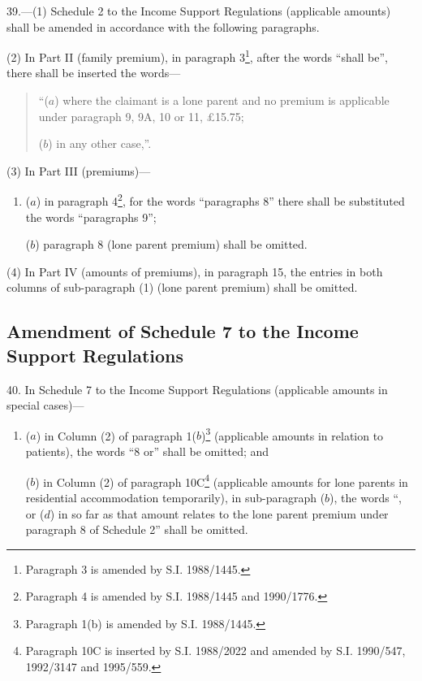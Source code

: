 \documentclass[12pt,a4paper]{article}
\begin{document}
\begin{sloppypar}
39.—(1) Schedule 2 to the Income Support Regulations (applicable amounts) shall be amended in accordance with the following paragraphs.
\end{sloppypar}

(2) In Part II (family premium), in paragraph 3\footnote{\frenchspacing Paragraph 3 is amended by S.I. 1988/1445.}, after the words “shall be”, there shall be inserted the words—
\begin{quotation}
“($a$) where the claimant is a lone parent and no premium is applicable under paragraph 9, 9A, 10 or 11, £15.75;

($b$) in any other case,”.
\end{quotation}

(3) In Part III (premiums)—
\begin{enumerate}\item[]
($a$) in paragraph 4\footnote{\frenchspacing Paragraph 4 is amended by S.I. 1988/1445 and 1990/1776.}, for the words “paragraphs 8” there shall be substituted the words “paragraphs 9”;

($b$) paragraph 8 (lone parent premium) shall be omitted.
\end{enumerate}

(4) In Part IV (amounts of premiums), in paragraph 15, the entries in both columns of sub-paragraph (1) (lone parent premium) shall be omitted.

\subsection[40. Amendment of Schedule 7 to the Income Support Regulations]{Amendment of Schedule 7 to the Income Support Regulations}

40.  In Schedule 7 to the Income Support Regulations (applicable amounts in special cases)—
\begin{enumerate}\item[]
($a$) in Column (2) of paragraph 1($b$)\footnote{\frenchspacing Paragraph 1(b) is amended by S.I. 1988/1445.} (applicable amounts in relation to patients), the words “8 or” shall be omitted; and

($b$) in Column (2) of paragraph 10C\footnote{\frenchspacing Paragraph 10C is inserted by S.I. 1988/2022 and amended by S.I. 1990/547, 1992/3147 and 1995/559.} (applicable amounts for lone parents in residential accommodation temporarily), in sub-paragraph ($b$), the words “, or ($d$) in so far as that amount relates to the lone parent premium under paragraph 8 of Schedule 2” shall be omitted.
\end{enumerate}
\end{document}
